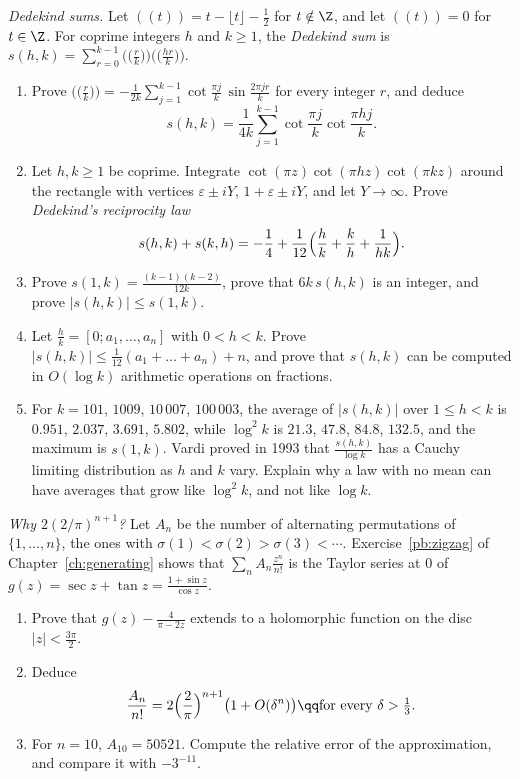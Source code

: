 \begin{exercise}[$\star\star\star$]\label{pb:dedekind}
\emph{Dedekind sums.} Let $((t))=t-\lfloor t\rfloor-\frac12$ for $t\notin\Z$, and let $((t))=0$ for $t\in\Z$. For coprime integers $h$ and $k\ge1$, the \emph{Dedekind sum} is $s(h,k)=\sum_{r=0}^{k-1}\bigl(\bigl(\frac rk\bigr)\bigr)\bigl(\bigl(\frac{hr}k\bigr)\bigr)$.
\begin{enumerate}[label=(\alph*)]
\item Prove $\bigl(\bigl(\frac rk\bigr)\bigr)=-\frac1{2k}\sum_{j=1}^{k-1}\cot\frac{\pi j}k\,\sin\frac{2\pi jr}k$ for every integer $r$, and deduce
\[
s(h,k)=\frac1{4k}\sum_{j=1}^{k-1}\cot\frac{\pi j}k\cot\frac{\pi hj}k.
\]
\item Let $h,k\ge1$ be coprime. Integrate $\cot(\pi z)\cot(\pi hz)\cot(\pi kz)$ around the rectangle with vertices $\varepsilon\pm iY$, $1+\varepsilon\pm iY$, and let $Y\to\infty$. Prove \emph{Dedekind's reciprocity law}
\[
s(h,k)+s(k,h)=-\frac14+\frac1{12}\Bigl(\frac hk+\frac kh+\frac1{hk}\Bigr).
\]
\item Prove $s(1,k)=\frac{(k-1)(k-2)}{12k}$, prove that $6k\,s(h,k)$ is an integer, and prove $|s(h,k)|\le s(1,k)$.
\item Let $\frac hk=[0;a_1,\dots,a_n]$ with $0<h<k$. Prove $|s(h,k)|\le\frac1{12}(a_1+\dots+a_n)+n$, and prove that $s(h,k)$ can be computed in $O(\log k)$ arithmetic operations on fractions.
\item For $k=101$, $1009$, $10\,007$, $100\,003$, the average of $|s(h,k)|$ over $1\le h<k$ is $0.951$, $2.037$, $3.691$, $5.802$, while $\log^2k$ is $21.3$, $47.8$, $84.8$, $132.5$, and the maximum is $s(1,k)$. Vardi proved in 1993 that $\frac{s(h,k)}{\log k}$ has a Cauchy limiting distribution as $h$ and $k$ vary. Explain why a law with no mean can have averages that grow like $\log^2k$, and not like $\log k$.
\end{enumerate}
\end{exercise}

\begin{exercise}[$\star\star$]\label{pb:zigzagpole}
\emph{Why $2(2/\pi)^{n+1}$?} Let $A_n$ be the number of alternating permutations of $\{1,\dots,n\}$, the ones with $\sigma(1)<\sigma(2)>\sigma(3)<\cdots$. Exercise~\ref{pb:zigzag} of Chapter~\ref{ch:generating} shows that $\sum_nA_n\frac{z^n}{n!}$ is the Taylor series at $0$ of $g(z)=\sec z+\tan z=\frac{1+\sin z}{\cos z}$.
\begin{enumerate}[label=(\alph*)]
\item Prove that $g(z)-\frac4{\pi-2z}$ extends to a holomorphic function on the disc $|z|<\frac{3\pi}2$.
\item Deduce
\[
\frac{A_n}{n!}=2\Bigl(\frac2\pi\Bigr)^{n+1}\bigl(1+O(\delta^n)\bigr)\qq\text{for every }\delta>\tfrac13.
\]
\item For $n=10$, $A_{10}=50521$. Compute the relative error of the approximation, and compare it with $-3^{-11}$.
\end{enumerate}
\end{exercise}

